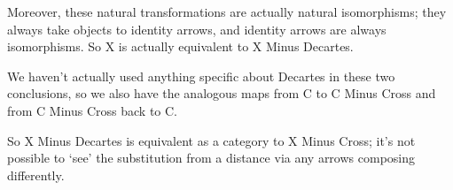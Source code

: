 \documentclass{proc-l}
\theoremstyle{definition}
\theoremstyle{remark}
\numberwithin{equation}{section}
\begin{document}
Moreover, these natural transformations are actually natural isomorphisms; they always take objects to identity arrows, and identity arrows are always isomorphisms. So X is actually equivalent to X Minus Decartes.

We haven't actually used anything specific about Decartes in these two conclusions, so we also have the analogous maps from C to C Minus Cross and from C Minus Cross back to C.

So X Minus Decartes is equivalent as a category to X Minus Cross; it's not possible to `see' the substitution from a distance via any arrows composing differently.
\end{document}
